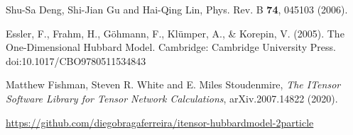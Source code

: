 \documentclass[prb,reprint,showpacs,twocolumn,superscriptaddress]{revtex4-2}
\begin{document}
\begin{thebibliography}{99}
 Shu-Sa Deng, Shi-Jian Gu and Hai-Qing Lin, Phys. Rev. B 
\textbf{74}, 045103 (2006).

 Essler, F., Frahm, H., Göhmann, F., Klümper, A., \& Korepin, V. (2005). The One-Dimensional Hubbard Model. Cambridge: Cambridge University Press. doi:10.1017/CBO9780511534843

Matthew Fishman, Steven R. White and E. Miles Stoudenmire, \textit{
 The \mbox{ITensor} Software Library for Tensor Network Calculations},
 arXiv.2007.14822 (2020).
 
\url{https://github.com/diegobragaferreira/itensor-hubbardmodel-2particle}

\end{thebibliography}
\end{document}
